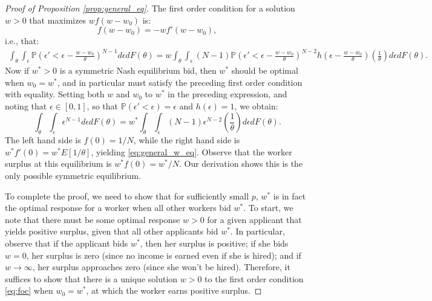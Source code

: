 \documentclass[11pt]{article}
\renewcommand{\P}{\ensuremath{\mathbb{P}}}
\begin{document}
\begin{proof}[Proof of Proposition \ref{prop:general_eq}]
The first order condition for a solution $w > 0$ that maximizes $w f(w - w_0)$ is:
\begin{equation}
\label{eq:foc}
f(w - w_0) = - w f'(w - w_0),
\end{equation}
i.e., that:
\begin{multline*}
\int_\theta \int_\epsilon \P\left(\epsilon' < \epsilon - \frac{w - w_0}{\theta}\right)^{N-1} d\epsilon dF(\theta) 
 = w \int_\theta \int_\epsilon (N-1) \P\left(\epsilon' < \epsilon - \frac{w - w_0}{\theta}\right)^{N-2} h\left( \epsilon - \frac{w - w_0}{\theta}\right) \left(\frac{1}{\theta} \right) d\epsilon dF(\theta). 
\end{multline*}
Now if $w^* > 0$ is a symmetric Nash equilibrium bid, then $w^*$ should be optimal when $w_0 = w^*$, and in particular must satisfy the preceding first order condition with equality.
Setting both $w$ and $w_0$ to $w^*$ in the preceding expression, and noting that $\epsilon \in [0,1]$, so that $\P(\epsilon' < \epsilon) = \epsilon$ and $h(\epsilon) = 1$, we obtain:
\[  \int_\theta \int_\epsilon \epsilon^{N-1} d\epsilon dF(\theta) = w^* \int_\theta \int_\epsilon (N-1) \epsilon^{N-2} \left(\frac{1}{\theta}\right) d\epsilon dF(\theta). \]
The left hand side is $f(0) = 1/N$, while the right hand side is $w^* f'(0) = w^* E[1/\theta]$, yielding \eqref{eq:general_w_eq}.
Observe that the worker surplus at this equilibrium is $w^* f(0) = w^*/N$.
Our derivation shows this is the only possible symmetric equilibrium.

To complete the proof, we need to show that for sufficiently small $p$, $w^*$ is in fact the optimal response for a worker when all other workers bid $w^*$.
To start, we note that there must be some optimal response $w > 0$ for a given applicant that yields positive surplus, given that all other applicants bid $w^*$.
In particular, observe that if the applicant bids $w^*$, then her surplus is positive;
if she bids $w = 0$, her surplus is zero (since no income is earned even if she is hired);
and if $w \to \infty$, her surplus approaches zero (since she won't be hired).
Therefore, it suffices to show that there is a unique solution $w > 0$ to the first order condition \eqref{eq:foc} when $w_0 = w^*$, at which the worker earns positive surplus.


\end{proof}
\end{document}
